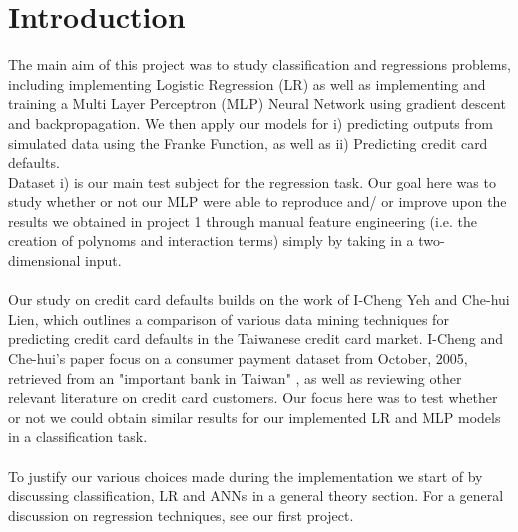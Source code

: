 \documentclass[10pt, a4paper, twocolumn]{article}
\begin{document}

\twocolumn[
\begin{@twocolumnfalse}
	\maketitle
	\begin{abstract}
		\abstractText
		\newline
		\newline
	\end{abstract}
\end{@twocolumnfalse}
]


\section{Introduction}
	The main aim of this project was to study classification and regressions problems, including implementing Logistic Regression (LR) as well as implementing and training a Multi Layer Perceptron (MLP) Neural Network using gradient descent and backpropagation. We then apply our models for i) predicting outputs from simulated data using the Franke Function, as well as ii) Predicting credit card defaults.\\ 
	Dataset i) is our main test subject for the regression task. Our goal here was to study whether or not our MLP were able to reproduce and/ or improve upon the results we obtained in project 1 through manual feature engineering (i.e. the creation of polynoms and interaction terms) simply by taking in a two-dimensional input.\\\\
	Our study on credit card defaults builds on the work of I-Cheng Yeh and Che-hui Lien\cite{ScientificArticle}, which outlines a comparison of various data mining techniques for predicting credit card defaults in the Taiwanese credit card market. I-Cheng and Che-hui's paper focus on a consumer payment dataset from October, 2005, retrieved from an "important bank in Taiwan" \cite{ScientificArticle}, as well as reviewing other relevant literature on credit card customers. Our focus here was to test whether or not we could obtain similar results for our implemented LR and MLP models in a classification task.\\\\
	To justify our various choices made during the implementation we start of by discussing classification, LR and ANNs in a general theory section. For a general discussion on regression techniques, see our first project\cite{Project1}.
\end{document}
